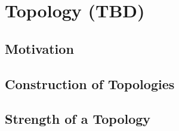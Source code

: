 \documentclass[../analysis.tex]{subfiles}
\begin{document}
    \section{Topology (TBD)}
    \subsection{Motivation}

    \subsection{Construction of Topologies}

    \subsection{Strength of a Topology}
\end{document}
